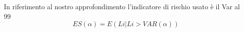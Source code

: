 \documentclass[titlepage]{article}
\begin{document}
\begin{itemize}
In riferimento al nostro approfondimento l’indicatore di rischio usato è il Var al 99%
$$ES(\alpha)=E(Li|Li>VAR(\alpha))$$





\end{itemize}
\end{document}
